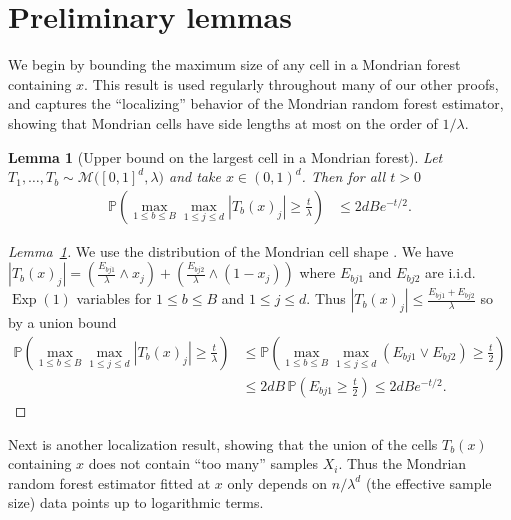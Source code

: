 \documentclass[11pt,lof]{puthesis}
\renewcommand{\P}{\ensuremath{\mathbb{P}}}
\newcommand{\cM}{\ensuremath{\mathcal{M}}}
\DeclareMathOperator{\Exp}{Exp}
\theoremstyle{break}
\newtheorem{lemma}{Lemma}[section]
\theoremstyle{proof}
\newtheorem{proof}{Proof}
\begin{document}
\section{Preliminary lemmas}

We begin by bounding the maximum size of any cell
in a Mondrian forest containing $x$.
This result is used regularly throughout many of our other proofs,
and captures the ``localizing'' behavior of the Mondrian random
forest estimator, showing that Mondrian cells have side lengths
at most on the order of $1/\lambda$.

\begin{lemma}[Upper bound on the largest cell in a Mondrian forest]%
  \label{lem:mondrian_app_largest_cell}
  Let $T_1, \ldots, T_b \sim \cM\big([0,1]^d, \lambda\big)$
  and take $x \in (0,1)^d$. Then for all $t > 0$
  \begin{align*}
    \P \left(
      \max_{1 \leq b \leq B}
      \max_{1 \leq j \leq d}
      |T_b(x)_j|
      \geq \frac{t}{\lambda}
    \right)
    &\leq
    2dB e^{-t/2}.
  \end{align*}

\end{lemma}

\begin{proof}[Lemma~\ref{lem:mondrian_app_largest_cell}]
  We use the distribution of the Mondrian cell shape
  \citep[Proposition~1]{mourtada2020minimax}. We have
  $|T_b(x)_j| = \left( \frac{E_{bj1}}{\lambda} \wedge x_j \right)
  + \left( \frac{E_{bj2}}{\lambda} \wedge (1-x_j) \right)$
  where $E_{bj1}$ and $E_{bj2}$
  are i.i.d.\ $\Exp(1)$ variables for
  $1 \leq b \leq B$ and $1 \leq j \leq d$.
  Thus $|T_b(x)_j| \leq \frac{E_{bj1} + E_{bj2}}{\lambda}$
  so by a union bound
  \begin{align*}
    \P \left(
      \max_{1 \leq b \leq B}
      \max_{1 \leq j \leq d}
      |T_b(x)_j|
      \geq \frac{t}{\lambda}
    \right)
    &\leq
    \P \left(
      \max_{1 \leq b \leq B}
      \max_{1 \leq j \leq d}
      (E_{bj1} \vee E_{bj2})
      \geq \frac{t}{2}
    \right) \\
    &\leq
    2dB\,
    \P \left(
      E_{bj1}
      \geq \frac{t}{2}
    \right)
    \leq
    2dB e^{-t/2}.
  \end{align*}
\end{proof}

Next is another localization result,
showing that the union
of the cells $T_b(x)$ containing $x$ does not contain ``too many''
samples $X_i$.
Thus the Mondrian random forest estimator fitted at $x$
only depends on $n/\lambda^d$ (the effective sample size)
data points up to logarithmic terms.
\end{document}
